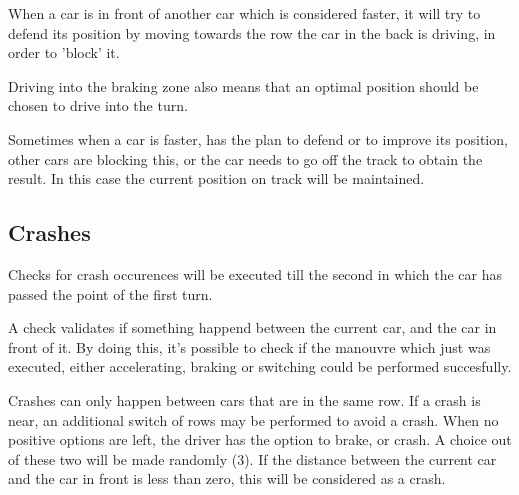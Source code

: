 When a car is in front of another car which is considered faster, it will try to defend its position by moving towards the row the car in the back is driving, in order to 'block' it.

Driving into the braking zone also means that an optimal position should be chosen to drive into the turn.

Sometimes when a car is faster, has the plan to defend or to improve its position, other cars are blocking this, or the car needs to go off the track to obtain the result. In this case the current position on track will be maintained.

\subsection{Crashes}
Checks for crash occurences will be executed till the second in which the car has passed the point of the first turn.

A check validates if something happend between the current car, and the car in front of it. By doing this, it's possible to check if the manouvre which just was executed, either accelerating, braking or switching could be performed succesfully.

Crashes can only happen between cars that are in the same row. If a crash is near, an additional switch of rows may be performed to avoid a crash. When no positive options are left, the driver has the option to brake, or crash. A choice out of these two will be made randomly (3). If the distance between the current car and the car in front is less than zero, this will be considered as a crash.
